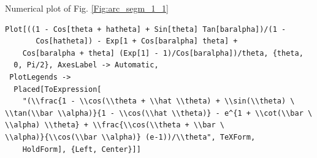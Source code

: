 \documentclass[reqno]{amsart}
\theoremstyle{definition} \newtheorem{definition}{Definition}[section]
\theoremstyle{definition} \newtheorem{remark}[definition]{Remark}
\theoremstyle{plain} \newtheorem{lemma}[definition]{Lemma}
\theoremstyle{plain} \newtheorem{proposition}[definition]{Proposition}
\theoremstyle{plain} \newtheorem{theorem}[definition]{Theorem}
\theoremstyle{plain} \newtheorem{corollary}[definition]{Corollary}
\theoremstyle{definition} \newtheorem{example}[definition]{Example}
\theoremstyle{plain} \newtheorem{claim}[clai]{Claim}
\theoremstyle{definition} \newtheorem{assumption}[definition]{Assumption}
\theoremstyle{definition} \newtheorem{observation}[definition]{Observation}
\newcommand{\1}{\mathbbm 1}
\newcommand{\smed}{\medskip}
\newcommand{\sbig}{\bigskip}
\numberwithin{equation}{section} %
\theoremstyle{plain} \newtheorem*{theorem*}{Theorem}
\theoremstyle{plain} \newtheorem{mthm}[maintheorem]{Main Theorem}
\theoremstyle{plain} \newtheorem*{mthm*}{Main Theorem}
\theoremstyle{plain} \newtheorem*{conjecture*}{Conjecture}
\theoremstyle{plain} \newtheorem{conjecture}[definition]{Conjecture}
\theoremstyle{plain} \newtheorem*{problem*}{Problem}
\begin{document}
\sbig


\sbig

\noindent Numerical plot of Fig. \ref{Fig:arc_segm_1_1}
\smed
\begin{verbatim}
Plot[((1 - Cos[theta + hatheta] + Sin[theta] Tan[baralpha])/(1 - 
       Cos[hatheta]) - Exp[1 + Cos[baralpha] theta] + 
    Cos[baralpha + theta] (Exp[1] - 1)/Cos[baralpha])/theta, {theta, 
  0, Pi/2}, AxesLabel -> Automatic, 
 PlotLegends -> 
  Placed[ToExpression[
    "(\\frac{1 - \\cos(\\theta + \\hat \\theta) + \\sin(\\theta) \
\\tan(\\bar \\alpha)}{1 - \\cos(\\hat \\theta)} - e^{1 + \\cot(\\bar \
\\alpha) \\theta} + \\frac{\\cos(\\theta + \\bar \
\\alpha)}{\\cos(\\bar \\alpha)} (e-1))/\\theta", TeXForm, 
    HoldForm], {Left, Center}]]
\end{verbatim}

\sbig


\sbig
\end{document}
